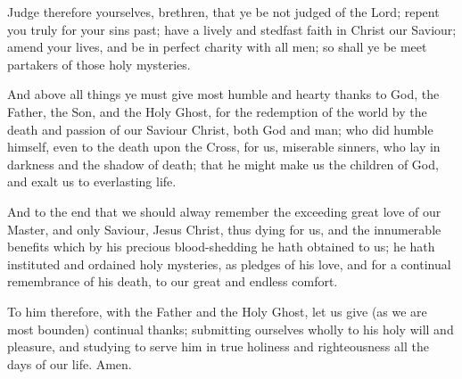 \begin{leftbar}


Judge therefore yourselves, brethren, that ye be not judged of the Lord; repent you truly for your sins past; have a lively and stedfast faith in Christ our Saviour; amend your lives, and be in perfect charity with all men; so shall ye be meet partakers of those holy mysteries.

And above all things ye must give most humble and hearty thanks to God, the Father, the Son, and the Holy Ghost, for the redemption of the world by the death and passion of our Saviour Christ, both God and man; who did humble himself, even to the death upon the Cross, for us, miserable sinners, who lay in darkness and the shadow of death; that he might make us the children of God, and exalt us to everlasting life.

And to the end that we should alway remember the exceeding great love of our Master, and only Saviour, Jesus Christ, thus dying for us, and the innumerable benefits which by his precious blood-shedding he hath obtained to us; he hath instituted and ordained holy mysteries, as pledges of his love, and for a continual remembrance of his death, to our great and endless comfort.

To him therefore, with the Father and the Holy Ghost, let us give (as we are most bounden) continual thanks; submitting ourselves wholly to his holy will and pleasure, and studying to serve him in true holiness and righteousness all the days of our life. \R Amen.
\end{leftbar}


